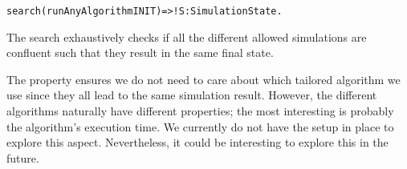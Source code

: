 \begin{alltt}
  search (runAnyAlgorithm INIT)  =>! S:SimulationState . 
\end{alltt}

The search exhaustively checks if all the different allowed simulations are confluent such that they result in the same final state.

The property ensures we do not need to care about which tailored algorithm we use since they all lead to the same simulation result.
However, the different algorithms naturally have different properties; the most interesting is probably the algorithm's execution time. 
We currently do not have the setup in place to explore this aspect.
Nevertheless, it could be interesting to explore this in the future.

